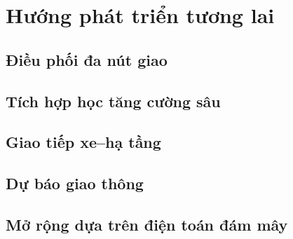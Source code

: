 \chapter{Hướng phát triển tương lai}
\section{Điều phối đa nút giao}
\section{Tích hợp học tăng cường sâu}
\section{Giao tiếp xe--hạ tầng}
\section{Dự báo giao thông}
\section{Mở rộng dựa trên điện toán đám mây}
